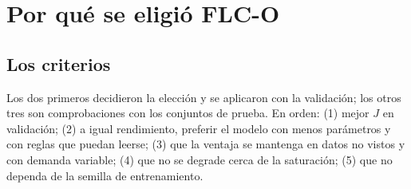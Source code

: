 \documentclass[11pt,a4paper]{article}
\begin{document}


\section{Por qué se eligió FLC-O}
\label{sec:porque}

\subsection{Los criterios}
Los dos primeros decidieron la elección y se aplicaron con la validación; los otros tres son comprobaciones con los conjuntos de prueba. En orden: (1) mejor $J$ en validación; (2) a igual rendimiento, preferir el modelo con menos parámetros y con reglas que puedan leerse; (3) que la ventaja se mantenga en datos no vistos y con demanda variable; (4) que no se degrade cerca de la saturación; (5) que no dependa de la semilla de entrenamiento.
\end{document}
